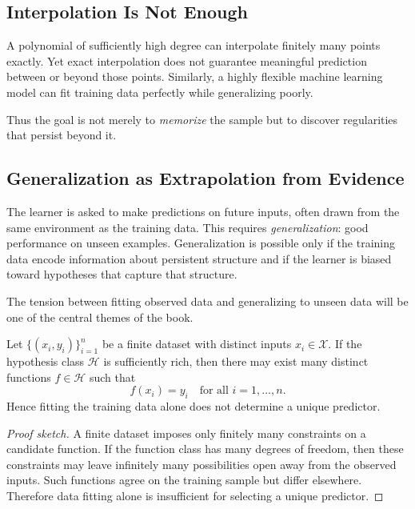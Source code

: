 \subsection{Interpolation Is Not Enough}

A polynomial of sufficiently high degree can interpolate finitely many points exactly. Yet exact interpolation does not guarantee meaningful prediction between or beyond those points. Similarly, a highly flexible machine learning model can fit training data perfectly while generalizing poorly.

Thus the goal is not merely to \emph{memorize} the sample but to discover regularities that persist beyond it.

\subsection{Generalization as Extrapolation from Evidence}

The learner is asked to make predictions on future inputs, often drawn from the same environment as the training data. This requires \emph{generalization}: good performance on unseen examples. Generalization is possible only if the training data encode information about persistent structure and if the learner is biased toward hypotheses that capture that structure.

The tension between fitting observed data and generalizing to unseen data will be one of the central themes of the book.

\begin{proposition}
Let $\{(x_i,y_i)\}_{i=1}^n$ be a finite dataset with distinct inputs $x_i \in \mathcal{X}$. If the hypothesis class $\mathcal{H}$ is sufficiently rich, then there may exist many distinct functions $f \in \mathcal{H}$ such that
\[
f(x_i)=y_i \quad \text{for all } i=1,\dots,n.
\]
Hence fitting the training data alone does not determine a unique predictor.
\end{proposition}

\begin{proof}[Proof sketch]
A finite dataset imposes only finitely many constraints on a candidate function. If the function class has many degrees of freedom, then these constraints may leave infinitely many possibilities open away from the observed inputs. Such functions agree on the training sample but differ elsewhere. Therefore data fitting alone is insufficient for selecting a unique predictor.
\end{proof}

